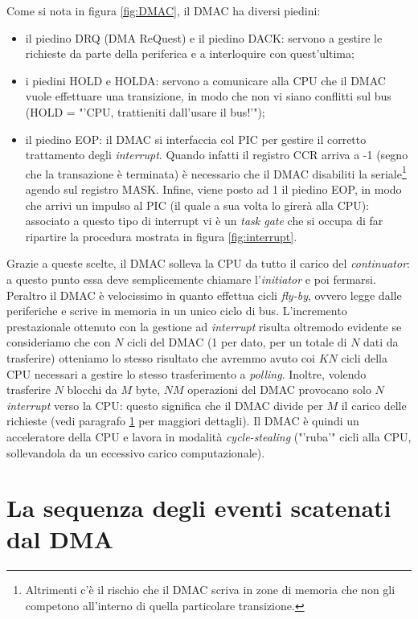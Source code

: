 Come si nota in figura \ref{fig:DMAC}, il DMAC ha diversi piedini:
\begin{itemize}
\item il piedino DRQ (DMA ReQuest) e il piedino DACK: servono a gestire le richieste da parte della periferica e a interloquire con quest'ultima;
\item i piedini HOLD e HOLDA: servono a comunicare alla CPU che il DMAC vuole effettuare una transizione, in modo che non vi siano conflitti sul bus (HOLD = "'CPU, trattieniti dall'usare il bus!'");
\item il piedino EOP: il DMAC si interfaccia col PIC per gestire il corretto trattamento degli \textit{interrupt}. Quando infatti il registro CCR arriva a -1 (segno che la transazione è terminata) è necessario che il DMAC disabiliti la seriale\footnote{Altrimenti c'è il rischio che il DMAC scriva in zone di memoria che non gli competono all'interno di quella particolare transizione.} agendo sul registro MASK. Infine, viene posto ad 1 il piedino EOP, in modo che arrivi un impulso al PIC (il quale a sua volta lo girerà alla CPU): associato a questo tipo di interrupt vi è un \textit{task gate} che si occupa di far ripartire la procedura mostrata in figura \ref{fig:interrupt}.
\end{itemize} 

Grazie a queste scelte, il DMAC solleva la CPU da tutto il carico del \textit{continuator}: a questo punto essa deve semplicemente chiamare l'\textit{initiator} e poi fermarsi. Peraltro il DMAC è velocissimo in quanto effettua cicli \textit{fly-by}, ovvero legge dalle periferiche e scrive in memoria in un unico ciclo di bus. L'incremento prestazionale ottenuto con la gestione ad \textit{interrupt} risulta oltremodo evidente se consideriamo che con $N$ cicli del DMAC (1 per dato, per un totale di $N$ dati da trasferire) otteniamo lo stesso risultato che avremmo avuto coi $KN$ cicli della CPU necessari a gestire lo stesso trasferimento a \textit{polling}. 
Inoltre, volendo trasferire $N$ blocchi da $M$ byte, $NM$ operazioni del DMAC provocano solo $N$ \textit{interrupt} verso la CPU: questo significa che il DMAC divide per $M$ il carico delle richieste (vedi paragrafo \ref{sec:sequenzaDMA} per maggiori dettagli).
Il DMAC è quindi un acceleratore della CPU e lavora in modalità \textit{cycle-stealing} ("'ruba'" cicli alla CPU, sollevandola da un eccessivo carico computazionale).

\section{La sequenza degli eventi scatenati dal DMA}
\label{sec:sequenzaDMA}

